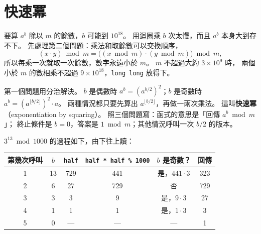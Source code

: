 \section{快速冪}
\label{sec:rec-power}

要算 $a^b$ 除以 $m$ 的餘數，$b$ 可能到 $10^{18}$。 用迴圈乘 $b$ 次太慢，而且
$a^b$ 本身大到存不下。 先處理第二個問題：乘法和取餘數可以交換順序，
\[
(x \cdot y) \bmod m = \big( (x \bmod m) \cdot (y \bmod m) \big) \bmod m,
\]
所以每乘一次就取一次餘數，數字永遠小於 $m$。 $m$ 不超過大約 $3 \times 10^9$ 時，
兩個小於 $m$ 的數相乘不超過 $9 \times 10^{18}$，\texttt{long long} 放得下。

第一個問題用分治解決。 $b$ 是偶數時 $a^b = (a^{b/2})^2$；$b$ 是奇數時
$a^b = (a^{\lfloor b/2 \rfloor})^2 \cdot a$。 兩種情況都只要先算出
$a^{\lfloor b/2 \rfloor}$，再做一兩次乘法。 這叫\textbf{快速冪}
（exponentiation by squaring）。 照三個問題寫：函式的意思是「回傳 $a^b \bmod m$」；
終止條件是 $b = 0$，答案是 $1 \bmod m$；其他情況呼叫一次 $b/2$ 的版本。



$3^{13} \bmod 1000$ 的過程如下，由下往上讀：

\begin{center}
\begin{tabular}{cccccc}
\toprule
第幾次呼叫 & $b$ & \texttt{half} & \texttt{half * half \% 1000} & $b$ 是奇數？ & 回傳 \\
\midrule
1 & 13 & 729 & 441 & 是，$441 \cdot 3$ & 323 \\
2 & 6 & 27 & 729 & 否 & 729 \\
3 & 3 & 3 & 9 & 是，$9 \cdot 3$ & 27 \\
4 & 1 & 1 & 1 & 是，$1 \cdot 3$ & 3 \\
5 & 0 & --- & --- & --- & 1 \\
\bottomrule
\end{tabular}
\end{center}

